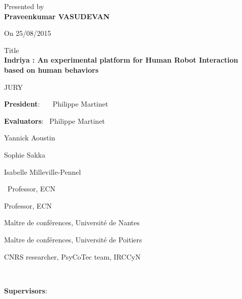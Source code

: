 \documentclass[11pt, openright]{Thesis} %
\begin{document}
\begin{titlepage}
\begin{center}
	\normalsize Presented by\\
	\vspace{0.1in}
	{\large \textbf{Praveenkumar VASUDEVAN}}
	\par
	\vspace{0.1in}
	On 25/08/2015
	\par
	\vspace{0.3in}
	\large Title\\
	\vspace{0.1in}
	\large \textbf{Indriya : An experimental platform for Human Robot Interaction based on human behaviors}
	\par
	\vspace{0.4in}
	\normalsize JURY
	\end{center}
	\par
	\vspace{0.2in}
	\noindent \begin{minipage}{0.5\textwidth}
	\begin{flushleft} 
	\textbf{President}: \  \  \ Philippe Martinet
	\par
	\vspace{0.2in}	
	\textbf{Evaluators}: \ Philippe Martinet
	\par
	\hspace{20mm} Yannick Aoustin
	\par
	\hspace{20mm} Sophie Sakka
	\par
	\hspace{20mm} Isabelle Milleville-Pennel
	\par
	\end{flushleft}
	\end{minipage}
	\begin{minipage}{0.55\textwidth}
	\begin{flushleft} 
	\
	Professor, ECN
	\par
	\vspace{0.2in}	
	Professor, ECN
	\par
	Ma\^{i}tre de conf\'{e}rences, Universit\'{e} de Nantes
	\par
	Ma\^{i}tre de conf\'{e}rences, Universit\'{e} de Poitiers	
	\par
	CNRS researcher, PsyCoTec team, IRCCyN
	\end{flushleft}
	\end{minipage}
	\\
	\par
	\vspace{0.1in}	
	\noindent \textbf{Supervisors}:
	\\

\end{titlepage}
\end{document}
